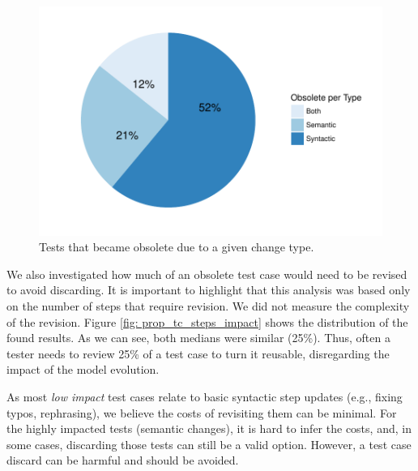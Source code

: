 \begin{figure}[h]
\centering
\includegraphics[width=.48\textwidth]{figs/v2_prop_obs_by_type.pdf}
\caption{Tests that became obsolete due to a given change type.}
\label{fig: prop_obs_by_type}
\end{figure}


\noindent
{}
\vspace{2mm} %


We also investigated how much of an obsolete test case would need to be revised to avoid discarding. It is important to highlight that this analysis was based only on the number of steps that require revision. We did not measure the complexity of the revision. Figure \ref{fig: prop_tc_steps_impact} shows the distribution of the found results. As we can see, both medians were similar (25\%). Thus, often a tester needs to review 25\% of a test case to turn it reusable, disregarding the impact of the model evolution. 

As most \textit{low impact} test cases relate to basic syntactic step updates (e.g., fixing typos, rephrasing), we believe the costs of revisiting them can be minimal. For the highly impacted tests (semantic changes), it is hard to infer the costs, and, in some cases, discarding those tests can still be a valid option. However, a test case discard can be harmful and should be avoided. 


